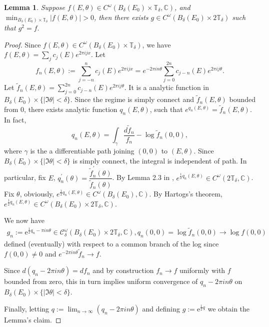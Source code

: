 \documentclass[11pt]{amsart}
\newtheorem{lemma}[theorem]{Lemma}
\theoremstyle{remark}
\theoremstyle{definition}
\newcommand{\C}{{\mathbf C}}
\newcommand{\T}{{\mathbf T}}
\def \C{{\mathcal{C}}}
\def\C{{\mathbb C}}
\def\T{{\mathbb T}}
\begin{document}
\begin{lemma}\label{sqrt}
	Suppose $f(E,\theta)\in C^\omega(B_\delta(E_0)\times\T_\delta,\C)$, and $\min_{B_\delta(E_0)\times\T_\delta}|f(E,\theta)|>0$, then there exists $g\in C^\omega(B_\delta(E_0)\times2\T_\delta)$ such that $g^2=f.$ 
\end{lemma}
\begin{proof}
Since $f(E,\theta)\in C^\omega(B_\delta(E_0)\times\T_\delta)$, we have $f(E,\theta)=\sum_{j}c_j(E)e^{2\pi i jx}.$ Let $$f_n(E,\theta):=\sum_{j=-n}^nc_j(E)e^{2\pi i jx}=e^{-2\pi i n\theta}\sum_{j=0}^{2n}c_{j-n}(E)e^{2\pi i j\theta}.$$
Let $\tilde{f}_n(E,\theta)=\sum_{j=0}^{2n}c_{j-n}(E)e^{2\pi i j\theta}.$ It is a analytic function   in $B_\delta(E_0)\times\{|\Im \theta|<\delta\}.$ Since the regime is simply connect and $\tilde{f}_n(E,\theta)$ bounded from $0$, there exists analytic function $q_n(E,\theta)$, such that $e^{q_n(E,\theta)}=\tilde{f}_n(E,\theta)$. In fact, $$q_n(E,\theta)=\int_{\gamma}\frac{d\tilde{f}_n}{f_n}-\log \tilde{f}_n(0,0),$$
where $\gamma$ is the a differentiable path joining $(0,0)$ to $(E,\theta)$. Since $B_\delta(E_0)\times\{|\Im \theta|<\delta\}$ is simply connect, the integral is independent of path.   In particular, fix $E$, $q_n^\prime(\theta) = \dfrac{\tilde{f}_n^\prime(\theta)}{\tilde{f}_n(\theta)}$. By Lemma 2.3 in \cite{JM}, $e^{\frac{1}{2}q_n(E,\theta)}\in C^\omega(2\T_\delta,\C)$. Fix $\theta$, obviously, $e^{\frac{1}{2}q_n(E,\theta)}\in C^\omega(B_\delta(E_0),\C)$. By Hartogs's theorem, $e^{\frac{1}{2}q_n(E,\theta)}\in C^\omega(B_\delta(E_0)\times 2\T_\delta,\C)$.

We now have 
\begin{eqnarray*}
	g_n:=\mathrm{e}^{\frac{1}{2} q_n-\pi in\theta} \in \mathcal{C}_\delta^\omega(B_\delta(E_0)\times2\T_\delta, \mathbb{C}),
	q_n(0,0) = \log \tilde{f}_n(0,0) \to \log f(0,0)
\end{eqnarray*}
defined (eventually) with respect to a common branch of the log since $f(0,0) \neq 0$ and $e^{-2\pi i n\theta}\tilde{f}_n \to f$. 

Since $d(q_n-2\pi i n\theta)=d{f}_n$
and by construction ${f}_n \to f$ uniformly with $f$ bounded from zero, this in turn implies uniform convergence of $q_n-2\pi i n\theta$ on $B_\delta(E_0)\times\{|\Im \theta|<\delta\}$.

Finally, letting $q:=\lim_{n \to \infty} (q_n-2\pi i n\theta)$ and defining $g:=\mathrm{e}^{\frac{1}{2} q}$ we obtain the Lemma's claim.
\end{proof}
\end{document}
